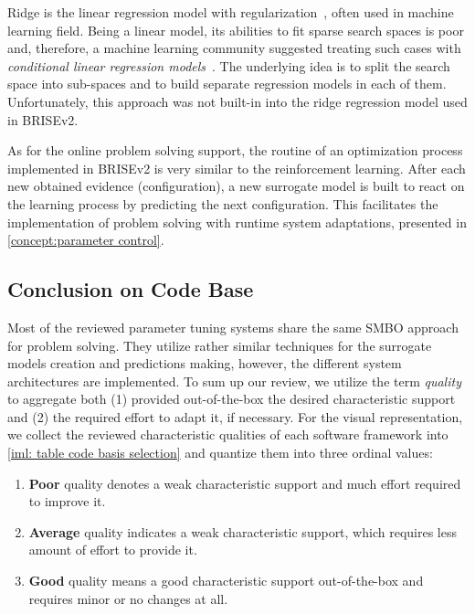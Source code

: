 Ridge is the linear regression model with regularization~\cite{hoerl1970ridge}, often used in machine learning field. Being a linear model, its abilities to fit sparse search spaces is poor and, therefore, a machine learning community suggested treating such cases with \emph{conditional linear regression models}~\cite{DBLP:journals/corr/abs-1806-02326}. The underlying idea is to split the search space into sub-spaces and to build separate regression models in each of them. Unfortunately, this approach was not built-in into the ridge regression model used in BRISEv2.

As for the online problem solving support, the routine of an optimization process implemented in BRISEv2 is very similar to the reinforcement learning. After each new obtained evidence (configuration), a new surrogate model is built to react on the learning process by predicting the next configuration. This facilitates the implementation of problem solving with runtime system adaptations, presented in \cref{concept:parameter control}.

\subsection{Conclusion on Code Base}\label{impl:hlh code basis conclusion}
Most of the reviewed parameter tuning systems share the same SMBO approach for problem solving. They utilize rather similar techniques for the surrogate models creation and predictions making, however, the different system architectures are implemented. To sum up our review, we utilize the term \emph{quality} to aggregate both (1) provided out-of-the-box the desired characteristic support and (2) the required effort to adapt it, if necessary. For the visual representation, we collect the reviewed characteristic qualities of each software framework into \cref{iml: table code basis selection} and quantize them into three ordinal values:
\begin{enumerate}
	\item \textbf{Poor} quality denotes a weak characteristic support and much effort required to improve it.
	\item \textbf{Average} quality indicates a weak characteristic support, which requires less amount of effort to provide it.
	\item \textbf{Good} quality means a good characteristic support out-of-the-box and requires minor or no changes at all.
\end{enumerate}

